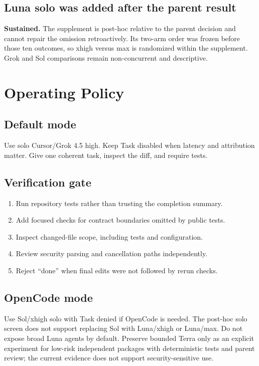 \documentclass[11pt,oneside]{article}
\begin{document}
\subsection{Luna solo was added after the parent result}

\textbf{Sustained.} The supplement is post-hoc relative to the parent decision
and cannot repair the omission retroactively. Its two-arm order was frozen
before those ten outcomes, so xhigh versus max is randomized within the
supplement. Grok and Sol comparisons remain non-concurrent and descriptive.

\section{Operating Policy}

\subsection{Default mode}

Use solo Cursor/Grok 4.5 high. Keep Task disabled when latency and attribution
matter. Give one coherent task, inspect the diff, and require tests.

\subsection{Verification gate}

\begin{enumerate}
  \item Run repository tests rather than trusting the completion summary.
  \item Add focused checks for contract boundaries omitted by public tests.
  \item Inspect changed-file scope, including tests and configuration.
  \item Review security parsing and cancellation paths independently.
  \item Reject ``done'' when final edits were not followed by rerun checks.
\end{enumerate}

\subsection{OpenCode mode}

Use Sol/xhigh solo with Task denied if OpenCode is needed. The post-hoc solo
screen does not support replacing Sol with Luna/xhigh or Luna/max. Do not expose
broad Luna agents by default. Preserve bounded Terra only as an explicit
experiment for low-risk independent packages with deterministic tests and
parent review; the current evidence does not support security-sensitive use.
\end{document}
